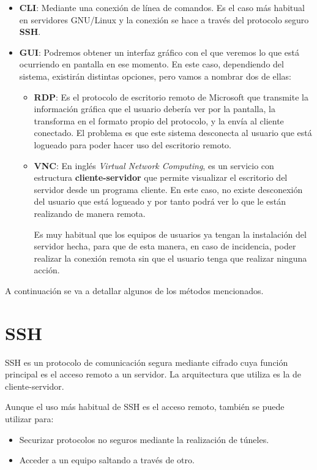 \begin{itemize}
    \item \textbf{CLI}: Mediante una conexión de línea de comandos. Es el caso más habitual en servidores GNU/Linux y la conexión se hace a través del protocolo seguro \textbf{SSH}.

    \item \textbf{GUI}: Podremos obtener un interfaz gráfico con el que veremos lo que está ocurriendo en pantalla en ese momento. En este caso, dependiendo del sistema, existirán distintas opciones, pero vamos a nombrar dos de ellas:

    \begin{itemize}
        \item \textbf{RDP}: Es el protocolo de escritorio remoto de Microsoft que transmite la información gráfica que el usuario debería ver por la pantalla, la transforma en el formato propio del protocolo, y la envía al cliente conectado. El problema es que este sistema desconecta al usuario que está logueado para poder hacer uso del escritorio remoto.

        \item \textbf{VNC}: En inglés \textit{Virtual Network Computing}, es un servicio con estructura \textbf{cliente-servidor} que permite visualizar el escritorio del servidor desde un programa cliente. En este caso, no existe desconexión del usuario que está logueado y por tanto podrá ver lo que le están realizando de manera remota.

        Es muy habitual que los equipos de usuarios ya tengan la instalación del servidor hecha, para que de esta manera, en caso de incidencia, poder realizar la conexión remota sin que el usuario tenga que realizar ninguna acción.
    \end{itemize}
\end{itemize}

A continuación se va a detallar algunos de los métodos mencionados.



\section{SSH}
SSH es un protocolo de comunicación segura mediante cifrado cuya función principal es el acceso remoto a un servidor. La arquitectura que utiliza es la de cliente-servidor.

Aunque el uso más habitual de SSH es el acceso remoto, también se puede utilizar para:
\begin{itemize}
    \item Securizar protocolos no seguros mediante la realización de túneles.
    \item Acceder a un equipo saltando a través de otro.
\end{itemize}

